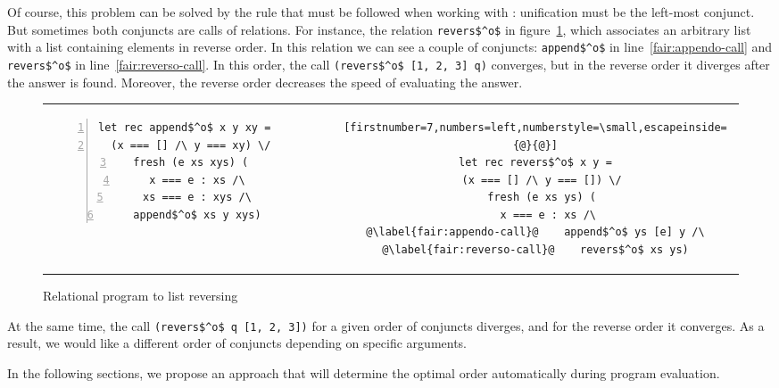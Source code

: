 Of course, this problem can be solved by the rule that must be followed when working with \mk: unification must be the left-most conjunct.
But sometimes both conjuncts are calls of relations.
For instance, the relation \lstinline{revers$^o$} in figure~\ref{fair:lst-reverso}, which associates an arbitrary list with a list containing elements in reverse order.
In this relation we can see a couple of conjuncts: \lstinline{append$^o$} in line~\ref{fair:appendo-call} and \lstinline{revers$^o$} in line~\ref{fair:reverso-call}. In this order, the call \lstinline{(revers$^o$ [1, 2, 3] q)} converges, but in the reverse order it diverges after the answer is found. Moreover, the reverse order decreases the speed of evaluating the answer.

\begin{figure}[h]
\centering
\begin{tabular}{cp{3cm}c}
\begin{lstlisting}[numbers=left,numberstyle=\small]
let rec append$^o$ x y xy =
  (x === [] /\ y === xy) \/
  fresh (e xs xys) (
    x === e : xs /\
    xs === e : xys /\
    append$^o$ xs y xys)
\end{lstlisting}
& &
\begin{lstlisting}[firstnumber=7,numbers=left,numberstyle=\small,escapeinside={@}{@}]
let rec revers$^o$ x y =
  (x === [] /\ y === []) \/
  fresh (e xs ys) (
    x === e : xs /\
@\label{fair:appendo-call}@    append$^o$ ys [e] y /\
@\label{fair:reverso-call}@    revers$^o$ xs ys)
\end{lstlisting}
\end{tabular}

\caption{Relational program to list reversing}
\label{fair:lst-reverso}
\end{figure}


At the same time, the call \lstinline{(revers$^o$ q [1, 2, 3])} for a given order of conjuncts diverges, and for the reverse order it converges. As a result, we would like a different order of conjuncts depending on specific arguments.

In the following sections, we propose an approach that will determine the optimal order automatically during program evaluation.

